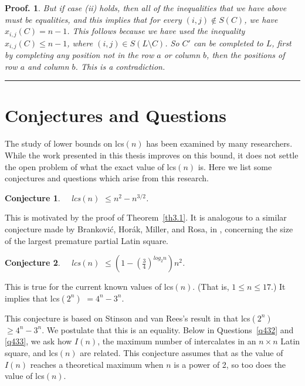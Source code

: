 \documentclass[12pt]{report}
\newtheorem{conjecture}{Conjecture}
\newtheorem{preproof}{{\bf Proof.}}
\newenvironment{proof}[1]{\begin{preproof}{\rm
               #1}\hfill{\rule[-0.5mm]{2mm}{2mm}}}{\end{preproof}}
\def\lcs#1{{\rm lcs}$(#1)$}
\begin{document}
\begin{proof}
{%

But if case (ii)
holds, then all of the inequalities that we have above
must be equalities, and
this implies that for every $(i,j)\not\in S(C)$, we have $x_{i,j}(C) = n - 1$.
This follows because we have used the inequality  $x_{i,j}(C)\le  n-1$, 
where $(i,j) \in S(L \setminus C)$.
So  $C'$ can be completed to $L$, first by completing any
position not in the row $a$ or column $b$, then the positions of row $a$
and column $b$. This is a contradiction.


%
}\end{proof}
%
\section{Conjectures and Questions}\label{sec43}
%
%
The study of lower bounds on \lcs{n} has been examined by many researchers.
While the work presented in this thesis improves on this bound, it does not settle the open problem
of what the exact value of \lcs{n} is.
Here we list some conjectures and questions which arise from this research.
\begin{conjecture}      \ \
\lcs{n} $ \leq n^2 - n^{3/2}$.
\end{conjecture}
%
This is motivated by the proof of Theorem~\ref{th3.1}.
It is analogous to a similar conjecture
made by Brankovi{\'c}, Hor{\'a}k, Miller, and Rosa, in \cite{mirka1}, concerning
the size of the largest premature partial Latin square.
%
\begin{conjecture} \ \
\lcs{n} $\leq (1 - (\frac{3}{4})^{log_2{n}}) n^{2}$.
\end{conjecture}
%
This is true for the current known values of \lcs{n}. (That is, $1 \leq n 
\leq 17$.) It implies that \lcs{2^n} $= 4^{n} - 3^{n}$.

This conjecture is based on Stinson and van Rees's result in
\cite{MR84g:05036} that \lcs{2^n} $\geq 4^{n} - 3^{n}$.
We postulate that this is an equality.  Below in Questions~\ref{q432} and \ref{q433}, we ask how $I(n)$, the
maximum number of intercalates in an $n \times n$ Latin square, and
\lcs{n} are related.  This conjecture assumes that as the value of $I(n)$
reaches a theoretical maximum when $n$ is a power of 2, so too does the value of \lcs{n}.
\end{document}
